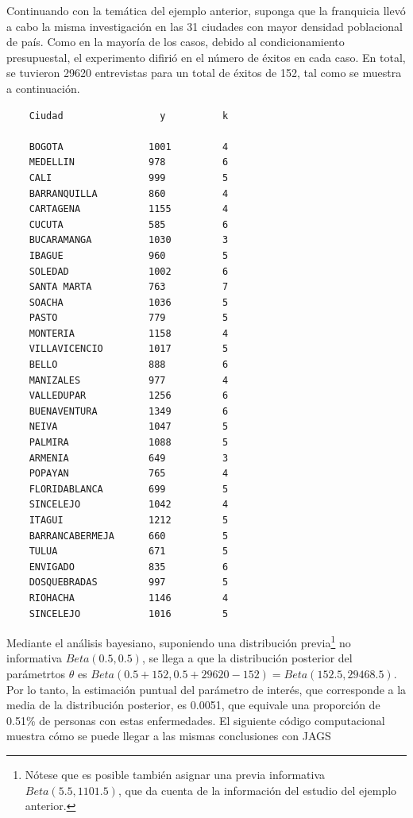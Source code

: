     \begin{Eje}
    Continuando con la tem\'atica del ejemplo anterior, suponga que la franquicia llev\'o a cabo la misma investigaci\'on en las 31 ciudades con mayor densidad poblacional de pa\'is. Como en la mayor\'ia de los casos, debido al condicionamiento presupuestal, el experimento difiri\'o en el n\'umero de \'exitos en cada caso. En total, se tuvieron 29620 entrevistas para un total de \'exitos de 152, tal como se muestra a continuaci\'on.
    
    \begin{center}
    \begin{verbatim}
    Ciudad                 y          k
    
    BOGOTA               1001         4
    MEDELLIN             978          6
    CALI                 999          5
    BARRANQUILLA         860          4
    CARTAGENA            1155         4
    CUCUTA               585          6
    BUCARAMANGA          1030         3
    IBAGUE               960          5
    SOLEDAD              1002         6
    SANTA MARTA          763          7
    SOACHA               1036         5
    PASTO                779          5
    MONTERIA             1158         4
    VILLAVICENCIO        1017         5
    BELLO                888          6
    MANIZALES            977          4
    VALLEDUPAR           1256         6
    BUENAVENTURA         1349         6
    NEIVA                1047         5
    PALMIRA              1088         5
    ARMENIA              649          3
    POPAYAN              765          4
    FLORIDABLANCA        699          5
    SINCELEJO            1042         4
    ITAGUI               1212         5
    BARRANCABERMEJA      660          5
    TULUA                671          5
    ENVIGADO             835          6
    DOSQUEBRADAS         997          5
    RIOHACHA             1146         4
    SINCELEJO            1016         5 
    \end{verbatim}
    \end{center}
    
    Mediante el an\'alisis bayesiano, suponiendo una distribuci\'on previa\footnote{N\'otese que es posible tambi\'en asignar una previa informativa $Beta(5.5, 1101.5)$, que da cuenta de la informaci\'on del estudio del ejemplo anterior.} no informativa $Beta(0.5, 0.5)$, se llega a que la distribuci\'on posterior del par\'ametrtos $\theta$ es $Beta(0.5+152, 0.5+29620-152)=Beta(152.5, 29468.5)$. Por lo tanto, la estimaci\'on puntual del par\'ametro de inter\'es, que corresponde a la media de la distribuci\'on posterior, es 0.0051, que equivale una proporci\'on de 0.51\% de personas con estas enfermedades. El siguiente c\'odigo computacional muestra c\'omo se puede llegar a las mismas conclusiones con JAGS
    

\end{Eje}
